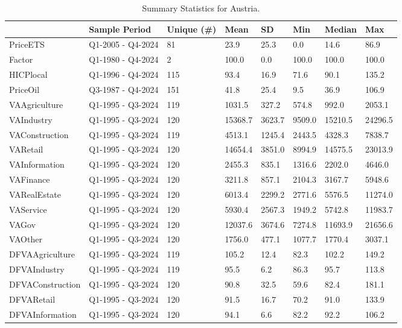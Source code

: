 \begin{longtable}[t]{llllllll}
\caption{Summary Statistics for Austria.}\\
\toprule
  & Sample Period & Unique (\#) & Mean & SD & Min & Median & Max\\
\midrule
PriceETS & Q1-2005 - Q4-2024 & 81 & 23.9 & 25.3 & 0.0 & 14.6 & 86.9\\
Factor & Q1-1980 - Q4-2024 & 2 & 100.0 & 0.0 & 100.0 & 100.0 & 100.0\\
HICPlocal & Q1-1996 - Q4-2024 & 115 & 93.4 & 16.9 & 71.6 & 90.1 & 135.2\\
PriceOil & Q3-1987 - Q4-2024 & 151 & 41.8 & 25.4 & 9.5 & 36.9 & 106.9\\
VAAgriculture & Q1-1995 - Q3-2024 & 119 & 1031.5 & 327.2 & 574.8 & 992.0 & 2053.1\\
\addlinespace
VAIndustry & Q1-1995 - Q3-2024 & 120 & 15368.7 & 3623.7 & 9509.0 & 15210.5 & 24296.5\\
VAConstruction & Q1-1995 - Q3-2024 & 119 & 4513.1 & 1245.4 & 2443.5 & 4328.3 & 7838.7\\
VARetail & Q1-1995 - Q3-2024 & 120 & 14654.4 & 3851.0 & 8994.9 & 14575.5 & 23013.9\\
VAInformation & Q1-1995 - Q3-2024 & 120 & 2455.3 & 835.1 & 1316.6 & 2202.0 & 4646.0\\
VAFinance & Q1-1995 - Q3-2024 & 120 & 3211.8 & 857.1 & 2104.3 & 3167.7 & 5948.6\\
\addlinespace
VARealEstate & Q1-1995 - Q3-2024 & 120 & 6013.4 & 2299.2 & 2771.6 & 5576.5 & 11274.0\\
VAService & Q1-1995 - Q3-2024 & 120 & 5930.4 & 2567.3 & 1949.2 & 5742.8 & 11983.7\\
VAGov & Q1-1995 - Q3-2024 & 120 & 12037.6 & 3674.6 & 7274.8 & 11693.9 & 21656.6\\
VAOther & Q1-1995 - Q3-2024 & 120 & 1756.0 & 477.1 & 1077.7 & 1770.4 & 3037.1\\
DFVAAgriculture & Q1-1995 - Q3-2024 & 119 & 105.2 & 12.4 & 82.3 & 102.2 & 149.2\\
\addlinespace
DFVAIndustry & Q1-1995 - Q3-2024 & 119 & 95.5 & 6.2 & 86.3 & 95.7 & 113.8\\
DFVAConstruction & Q1-1995 - Q3-2024 & 120 & 90.8 & 32.5 & 59.6 & 82.4 & 181.1\\
DFVARetail & Q1-1995 - Q3-2024 & 120 & 91.5 & 16.7 & 70.2 & 91.0 & 133.9\\
DFVAInformation & Q1-1995 - Q3-2024 & 120 & 94.1 & 6.6 & 82.2 & 92.2 & 106.2\\

\end{longtable}
